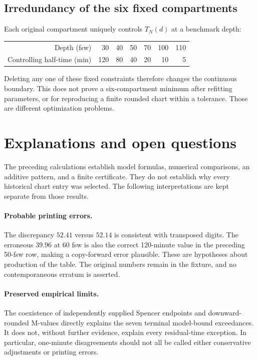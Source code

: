\documentclass[11pt,letterpaper]{article}
\begin{document}
\subsection{Irredundancy of the six fixed compartments}
Each original compartment uniquely controls $T_N(d)$ at a benchmark depth:
\begin{center}
\begin{tabular}{@{}rrrrrrr@{}}\toprule
Depth (fsw)&30&40&50&70&100&110\\
Controlling half-time (min)&120&80&40&20&10&5\\\bottomrule
\end{tabular}
\end{center}
Deleting any one of these fixed constraints therefore changes the continuous boundary. This does not prove a six-compartment minimum after refitting parameters, or for reproducing a finite rounded chart within a tolerance. Those are different optimization problems.

\section{Explanations and open questions}\label{sec:open}
The preceding calculations establish model formulas, numerical comparisons, an additive pattern, and a finite certificate. They do not establish why every historical chart entry was selected. The following interpretations are kept separate from those results.

\paragraph{Probable printing errors.}
The discrepancy $52.41$ versus $52.14$ is consistent with transposed digits. The erroneous $39.96$ at 60 fsw is also the correct 120-minute value in the preceding 50-fsw row, making a copy-forward error plausible. These are hypotheses about production of the table. The original numbers remain in the fixture, and no contemporaneous erratum is asserted.

\paragraph{Preserved empirical limits.}
The coexistence of independently supplied Spencer endpoints and downward-rounded M-values directly explains the seven terminal model-bound exceedances. It does not, without further evidence, explain every residual-time exception. In particular, one-minute disagreements should not all be called either conservative adjustments or printing errors.
\end{document}
